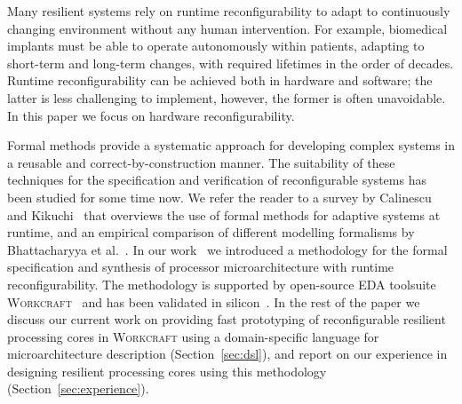 \documentclass[conference]{IEEEtran}
\begin{document}
Many resilient systems rely on runtime reconfigurability to adapt to
continuously changing environment without any human intervention. For example,
biomedical implants must be able to operate autonomously within patients,
adapting to short-term and long-term changes, with required lifetimes in the
order of decades. Runtime reconfigurability can be achieved both in hardware
and software; the latter is less challenging to implement, however, the former
is often unavoidable. In this paper we focus on hardware reconfigurability.

Formal methods provide a systematic approach for developing complex systems
in a reusable and correct-by-construction manner. The suitability of these
techniques for the specification and verification of reconfigurable
systems has been studied for some time now. We refer the reader to a survey by
Calinescu and Kikuchi~\cite{calinescu2010formal} that overviews the use of
formal methods for adaptive systems at runtime, and an empirical comparison
of different modelling formalisms by
Bhattacharyya et al.~\cite{DBLP:journals/corr/BhattacharyyaMP16}. In our
work~\cite{ISA-formal} we introduced a methodology for the formal specification
and synthesis of processor microarchitecture with runtime reconfigurability.
The methodology is supported by open-source EDA toolsuite
\textsc{Workcraft}~\cite{workcraft_web} and has been validated in silicon~\cite{rec-proc}.
In the rest of the paper we discuss our current work on
providing fast prototyping of reconfigurable resilient processing cores in
\textsc{Workcraft} using a domain-specific language for
microarchitecture description (Section~\ref{sec:dsl}), and report on our
experience in designing resilient processing cores using this methodology
(Section~\ref{sec:experience}).

\end{document}
